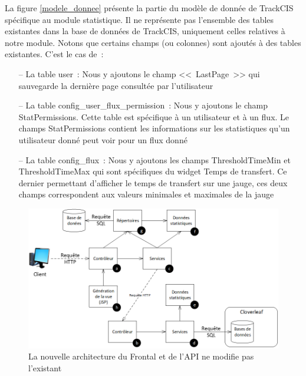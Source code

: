 			La figure \ref{modele_donnee} présente la partie du modèle de donnée de
			TrackCIS spécifique au module statistique. Il ne représente pas
			l'ensemble des tables existantes dans la base de données de TrackCIS,
			uniquement celles relatives à notre module. Notons que certains champs (ou
			colonnes) sont ajoutés à des tables existantes. C'est le cas de~:
			\begin{itemize}
			  \item[-- La table user~:] Nous y ajoutons le champ <<~LastPage~>> qui
			  sauvegarde la dernière page consultée par l'utilisateur
			  \item[-- La table config\_user\_flux\_permission~:] Nous y ajoutons le
			  champ StatPermissions. Cette table est spécifique à un utilisateur et à un
			  flux.
			  Le champs StatPermissions contient les informations sur les statistiques
			  qu'un utilisateur donné peut voir pour un flux donné
			  \item[-- La table config\_flux~:] Nous y ajoutons les champs
			  ThresholdTimeMin et ThresholdTimeMax qui sont spécifiques du widget Temps
			  de transfert.
			  Ce dernier permettant d'afficher le temps de transfert sur une jauge, ces
			  deux champs correspondent aux valeurs minimales et maximales de la jauge
			\end{itemize}
			
			\begin{figure}[H]
				\centering
				\includegraphics[width=16cm]{../img/part3/archi_stats.png}
				\caption{\label{archi_stats} La nouvelle architecture du Frontal et de
				l'API ne modifie pas l'existant}
			\end{figure}
			
